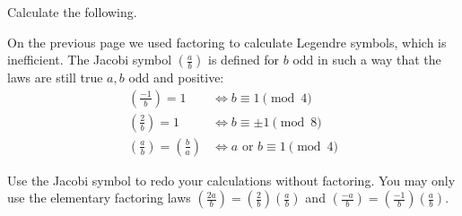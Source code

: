 \documentclass[12pt]{exam}
\begin{document}
\begin{questions}
  Calculate the following.
  \newpage
  \question On the previous page we used factoring to calculate Legendre symbols, which is inefficient. The Jacobi symbol $(\frac ab)$ is defined for $b$ odd in such a way that the laws are still true $a,b$ odd and positive:
  \begin{align*}
    \left(\frac{-1}b\right)=1\quad&\iff b\equiv1\pmod{4}\\
    \left(\frac2b\right)=1\quad&\iff b\equiv\pm1\pmod{8}\\
    \left(\frac ab\right)=\left(\frac ba\right)&\iff a\text{ or }b\equiv1\pmod{4}
  \end{align*}
  
  Use the Jacobi symbol to redo your calculations without factoring. You may only use the elementary factoring laws $(\frac{2a}{b})=(\frac2b)(\frac ab)$ and $(\frac{-a}{b})=(\frac{-1}{b})(\frac ab)$.
\end{questions}
\end{document}

